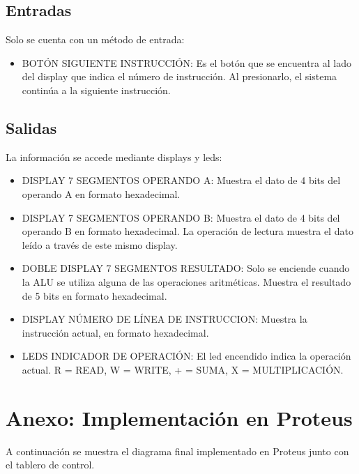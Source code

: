 \documentclass{sciposter}
\begin{document}
\begin{multicols*}{2}
\subsection{Entradas}

Solo se cuenta con un método de entrada:

\begin{itemize}
    \item BOTÓN SIGUIENTE INSTRUCCIÓN: Es el botón que se encuentra al lado del display que indica el número de instrucción. Al presionarlo, el sistema continúa a la siguiente instrucción.
\end{itemize}

\subsection{Salidas}

La información se accede mediante displays y leds:

\begin{itemize}
    \item DISPLAY 7 SEGMENTOS OPERANDO A: Muestra el dato de 4 bits del operando A en formato hexadecimal.
    \item DISPLAY 7 SEGMENTOS OPERANDO B: Muestra el dato de 4 bits del operando B en formato hexadecimal. La operación de lectura muestra el dato leído a través de este mismo display.
    \item DOBLE DISPLAY 7 SEGMENTOS RESULTADO: Solo se enciende cuando la ALU se utiliza alguna de las operaciones aritméticas. Muestra el resultado de 5 bits en formato hexadecimal.
    \item DISPLAY NÚMERO DE LÍNEA DE INSTRUCCION: Muestra la instrucción actual, en formato hexadecimal.
    \item LEDS INDICADOR DE OPERACIÓN: El led encendido indica la operación actual. R = READ, W = WRITE, + = SUMA, X = MULTIPLICACIÓN.
\end{itemize}

\end{multicols*}

\newpage

\section{Anexo: Implementación en Proteus}

A continuación se muestra el diagrama final implementado en Proteus junto con el tablero de control.
\end{document}

